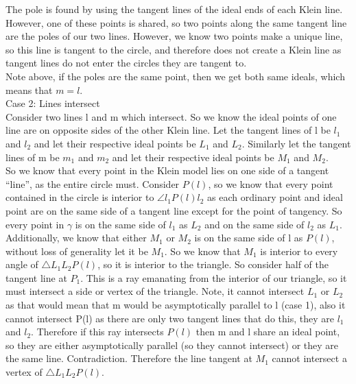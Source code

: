\documentclass[12pt,letterpaper]{article}
\begin{document}
The pole is found by using the tangent lines of the ideal ends of each Klein line.  However, one of these points is shared, so two points along the same tangent line are the poles of our two lines.  However, we know two points make a unique line, so this line is tangent to the circle, and therefore does not create a Klein line as tangent lines do not enter the circles they are tangent to. \\

Note above, if the poles are the same point, then we get both same ideals, which means that $m=l$.\\


Case 2: Lines intersect\\

Consider two lines l and m which intersect.  So we know the ideal points of one line are on opposite sides of the other Klein line.  Let the tangent lines of l be $l_1$ and $l_2$ and let their respective ideal points be $L_1$ and $L_2$.  Similarly let the tangent lines of m be $m_1$ and $m_2$ and let their respective ideal points be $M_1$ and $M_2$. \\


So we know that every point in the Klein model lies on one side of a tangent ``line'', as the entire circle must.  Consider $P(l)$, so we know that every point contained in the circle is interior to $\angle l_1 P(l) l_2$ as each ordinary point and ideal point are on the same side of a tangent line except for the point of tangency.  So every point in $\gamma$ is on the same side of $l_1$ as $L_2$ and on the same side of $l_2$ as $L_1$. Additionally, we know that either $M_1$ or $M_2$ is on the same side of l as $P(l)$, without loss of generality let it be $M_1$.  So we know that $M_1$ is interior to every angle of $\triangle L_1L_2P(l)$, so it is interior to the triangle.  So consider half of the tangent line at $P_1$.  This is a ray emanating from the interior of our triangle, so it must intersect a side or vertex of the triangle. Note, it cannot intersect $L_1$ or $L_2$ as that would mean that m would be asymptotically parallel to l (case 1), also it cannot intersect P(l) as there are only two tangent lines that do this, they are $l_1$ and $l_2$.  Therefore if this ray intersects $P(l)$ then m and l share an ideal point, so they are either asymptotically parallel (so they cannot intersect) or they are the same line.  Contradiction.  Therefore the line tangent at $M_1$ cannot intersect a vertex of $\triangle L_1L_2P(l)$.\\
\end{document}
